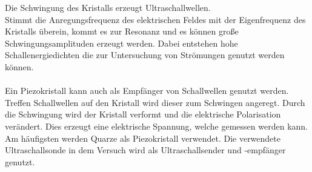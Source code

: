 Die Schwingung des Kristalls erzeugt Ultraschallwellen.\\
Stimmt die Anregungsfrequenz des elektrischen Feldes mit der Eigenfrequenz des Kristalls überein, kommt es zur Resonanz und es können große Schwingungsamplituden erzeugt werden.
Dabei entstehen hohe Schallenergiedichten die zur Untersuchung von Strömungen genutzt werden können.
\\
\\
Ein Piezokristall kann auch als Empfänger von Schallwellen genutzt werden.
Treffen Schallwellen auf den Kristall wird dieser zum Schwingen angeregt.
Durch die Schwingung wird der Kristall verformt und die elektrische Polarisation verändert.
Dies erzeugt eine elektrische Spannung, welche gemessen werden kann.\\
Am häufigsten werden Quarze als Piezokristall verwendet.
Die verwendete Ultraschallsonde in dem Versuch wird als Ultraschallsender und -empfänger genutzt.